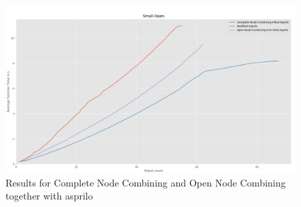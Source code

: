 \documentclass[runningheads]{llncs}
\begin{document}
\begin{figure}[H]
\includegraphics[scale=0.4]{Images/Results-Small-Open-3}
\caption{Results for Complete Node Combining and Open Node Combining together with asprilo}
\end{figure}
\end{document}
